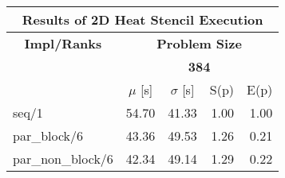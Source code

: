 \begin{tabular}{|lllll|}
\hline
\multicolumn{5}{|c|}{\textbf{Results of 2D Heat Stencil Execution}} \\ \hline
\multicolumn{1}{|c|}{\textbf{Impl/Ranks}} & \multicolumn{4}{c|}{\textbf{Problem Size}} \\ \hline
\multicolumn{1}{|c|}{\textbf{}} & \multicolumn{4}{c|}{\textbf{384}} \\ \hline
\multicolumn{1}{|l|}{} & \multicolumn{1}{c|}{$\mu$ [s]} & \multicolumn{1}{c|}{$\sigma$ [s]} & \multicolumn{1}{c|}{S(p)} & \multicolumn{1}{c|}{E(p)} \\ \hline
\multicolumn{1}{|l|}{seq/1}  & \multicolumn{1}{r|}{54.70} & \multicolumn{1}{r|}{41.33} & \multicolumn{1}{r|}{1.00} & \multicolumn{1}{r|}{1.00}  \\ \hline
\multicolumn{1}{|l|}{par\_block/6}  & \multicolumn{1}{r|}{43.36} & \multicolumn{1}{r|}{49.53} & \multicolumn{1}{r|}{1.26} & \multicolumn{1}{r|}{0.21}  \\ \hline
\multicolumn{1}{|l|}{par\_non\_block/6}  & \multicolumn{1}{r|}{42.34} & \multicolumn{1}{r|}{49.14} & \multicolumn{1}{r|}{1.29} & \multicolumn{1}{r|}{0.22}  \\ \hline
\end{tabular}
